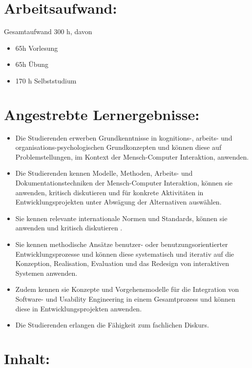 \section*{Arbeitsaufwand:}\label{arbeitsaufwand-8}

Gesamtaufwand 300 h, davon

\begin{itemize}
\item
  65h Vorlesung
\item
  65h Übung
\item
  170 h Selbststudium
\end{itemize}

\section*{Angestrebte
Lernergebnisse:}\label{angestrebte-lernergebnisse-15}

\begin{itemize}
\item
  Die Studierenden erwerben Grundkenntnisse in kognitions-, arbeits- und
  organisations-psychologischen Grundkonzepten und können diese auf
  Problemstellungen, im Kontext der Mensch-Computer Interaktion,
  anwenden.
\item
  Die Studierenden kennen Modelle, Methoden, Arbeits- und
  Dokumentationstechniken der Mensch-Computer Interaktion, können sie
  anwenden, kritisch diskutieren und für konkrete Aktivitäten in
  Entwicklungsprojekten unter Abwägung der Alternativen auswählen.
\item
  Sie kennen relevante internationale Normen und Standards, können sie
  anwenden und kritisch diskutieren .
\item
  Sie kennen methodische Ansätze benutzer- oder benutzungsorientierter
  Entwicklungsprozesse und können diese systematisch und iterativ auf
  die Konzeption, Realisation, Evaluation und das Redesign von
  interaktiven Systemen anwenden.
\item
  Zudem kennen sie Konzepte und Vorgehensmodelle für die Integration von
  Software- und Usability Engineering in einem Gesamtprozess und können
  diese in Entwicklungsprojekten anwenden.
\item
  Die Studierenden erlangen die Fähigkeit zum fachlichen Diskurs.
\end{itemize}

\section*{Inhalt:}\label{inhalt-15}

